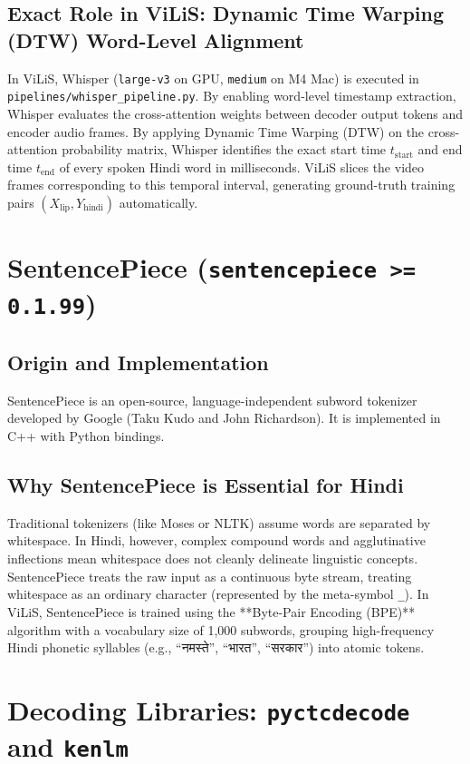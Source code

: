 \documentclass[11pt,a4paper]{report}
\begin{document}
\subsection{Exact Role in ViLiS: Dynamic Time Warping (DTW) Word-Level Alignment}
In ViLiS, Whisper (\texttt{large-v3} on GPU, \texttt{medium} on M4 Mac) is executed in \texttt{pipelines/whisper\_pipeline.py}.
By enabling word-level timestamp extraction, Whisper evaluates the cross-attention weights between decoder output tokens and encoder audio frames. By applying Dynamic Time Warping (DTW) on the cross-attention probability matrix, Whisper identifies the exact start time $t_{\text{start}}$ and end time $t_{\text{end}}$ of every spoken Hindi word in milliseconds. ViLiS slices the video frames corresponding to this temporal interval, generating ground-truth training pairs $(X_{\text{lip}}, Y_{\text{hindi}})$ automatically.

\section{SentencePiece (\texttt{sentencepiece >= 0.1.99})}
\subsection{Origin and Implementation}
SentencePiece is an open-source, language-independent subword tokenizer developed by Google (Taku Kudo and John Richardson). It is implemented in C++ with Python bindings.
\subsection{Why SentencePiece is Essential for Hindi}
Traditional tokenizers (like Moses or NLTK) assume words are separated by whitespace. In Hindi, however, complex compound words and agglutinative inflections mean whitespace does not cleanly delineate linguistic concepts. SentencePiece treats the raw input as a continuous byte stream, treating whitespace as an ordinary character (represented by the meta-symbol \texttt{\_}).
In ViLiS, SentencePiece is trained using the **Byte-Pair Encoding (BPE)** algorithm with a vocabulary size of 1,000 subwords, grouping high-frequency Hindi phonetic syllables (e.g., ``नमस्ते'', ``भारत'', ``सरकार'') into atomic tokens.

\section{Decoding Libraries: \texttt{pyctcdecode} and \texttt{kenlm}}
\end{document}
